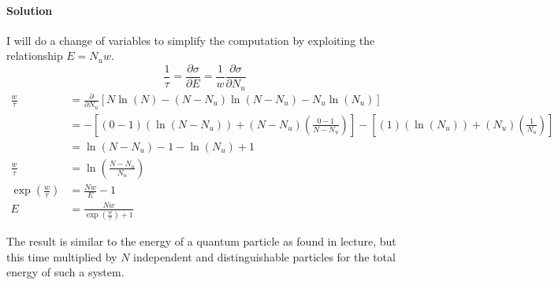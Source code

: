 \documentclass{article}
\begin{document}
\begin{enumerate}
		\paragraph{Solution} I will do a change of variables to simplify the computation by exploiting the relationship $E = N_u w$.
		\[
			\frac{1}{\tau} = \frac{\partial \sigma}{\partial E} = \frac{1}{w} \frac{\partial \sigma}{\partial N_u} 
		\]
		\begin{align*}
			\frac{w}{\tau} &= \frac{\partial}{\partial N_u} \left[ N\ln(N) - \left( N - N_u \right)\ln(N - N_u) - N_u\ln(N_u) \right] \\
			&= - \left[ \left( 0 - 1 \right)\left( \ln(N - N_u) \right) + \left( N - N_u \right)\left( \frac{0 - 1}{N - N_u} \right) \right] - \left[ \left( 1 \right)\left( \ln(N_u) \right) + \left( N_u \right)\left( \frac{1}{N_u} \right) \right] \\ 
			&= \ln(N - N_u) - 1 - \ln(N_u) + 1 \\
			\frac{w}{\tau} &= \ln(\frac{N - N_u}{N_u}) \\
			\exp(\frac{w}{\tau}) &= \frac{Nw}{E} - 1 \\
			E &= \boxed{\frac{Nw}{\exp(\frac{w}{\tau}) + 1}}
		\end{align*}
		
		The result is similar to the energy of a quantum particle as found in lecture, but this time multiplied by $N$ independent and distinguishable particles for the total energy of such a system.
	\end{enumerate}
		
\end{document}
